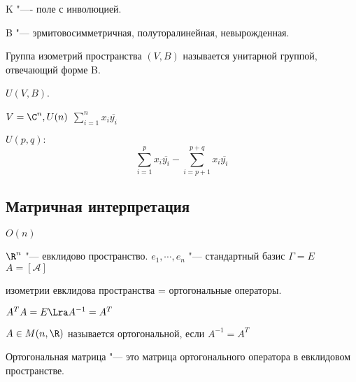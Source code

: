 \begin{Def}
K "---- поле с инволюцией. 

B "--- эрмитовосимметричная, полуторалинейная, невырожденная. 

Группа изометрий пространства $(V, B)$   называется унитарной группой, отвечающий форме B.

$U(V, B)$. 

\end{Def}

\begin{exmp}
$V = \C^n, U(n)$
$\sum_{i = 1}^{n} x_i\overline{y_i}$


$U(p, q):$
$$\sum_{i = 1}^{p} x_i\overline{y_i}  - \sum_{i = p + 1}^{p + q} x_i\overline{y_i}$$
\end{exmp}

\subsection{Матричная интерпретация}
$O(n)$

$\R^{n}$ "--- евклидово пространство. 
$e_1, \cdots, e_n$ "--- стандартный базис $\Gamma = E$
$A = [\mathscr{A}]$

изометрии евклидова пространства = ортогональные операторы. 

$A^TA = E \Lra A^{-1} = A^{T}$

\begin{Def}
$A \in M(n, \R)$ называется ортогональной, если $A^{-1} = A^{T}$
\end{Def}

Ортогональная матрица "--- это матрица ортогонального оператора в евклидовом пространстве. 

